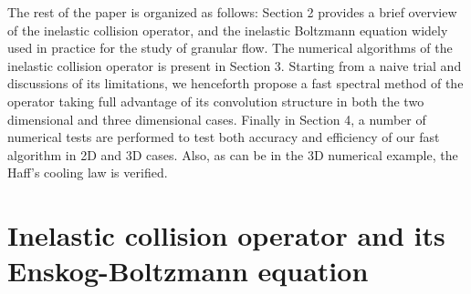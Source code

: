\documentclass[review, times]{elsarticle}
\begin{document}

The rest of the paper is organized as follows: Section 2 provides a brief overview of the inelastic collision operator, and the inelastic Boltzmann equation widely used in practice for the study of granular flow. The numerical algorithms of the inelastic collision operator is present in Section 3. Starting from a naive trial and discussions of its limitations, we henceforth propose a fast spectral method of the operator taking full advantage of its convolution structure in both the two dimensional and three dimensional cases. Finally in Section 4, a number of numerical tests are performed to test both accuracy and efficiency of our fast algorithm in 2D and 3D cases. Also, as can be in the 3D numerical example, the Haff's cooling law is verified.

\section{Inelastic collision operator and its Enskog-Boltzmann equation}
\end{document}

